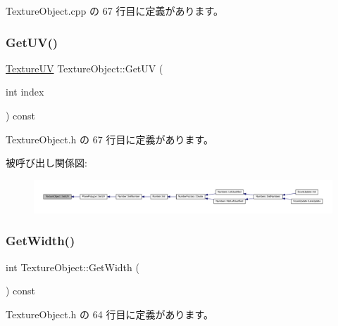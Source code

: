 Texture\+Object.\+cpp の 67 行目に定義があります。

\mbox{\label{class_texture_object_a51b8a2723302c2d38624a62f9205c4bb}} 
\subsubsection{\texorpdfstring{Get\+U\+V()}{GetUV()}}
{\footnotesize\ttfamily \mbox{\hyperlink{struct_texture_object_1_1_texture_u_v}{Texture\+UV}} Texture\+Object\+::\+Get\+UV (\begin{DoxyParamCaption}\item[{int}]{index }\end{DoxyParamCaption}) const\hspace{0.3cm}{\ttfamily [inline]}}



 Texture\+Object.\+h の 67 行目に定義があります。

被呼び出し関係図\+:\nopagebreak
\begin{figure}[H]
\begin{center}
\leavevmode
\includegraphics[width=350pt]{class_texture_object_a51b8a2723302c2d38624a62f9205c4bb_icgraph}
\end{center}
\end{figure}
\mbox{\label{class_texture_object_a72c079770e7e4355b6481d28a0a472ac}} 
\subsubsection{\texorpdfstring{Get\+Width()}{GetWidth()}}
{\footnotesize\ttfamily int Texture\+Object\+::\+Get\+Width (\begin{DoxyParamCaption}{ }\end{DoxyParamCaption}) const\hspace{0.3cm}{\ttfamily [inline]}}



 Texture\+Object.\+h の 64 行目に定義があります。

